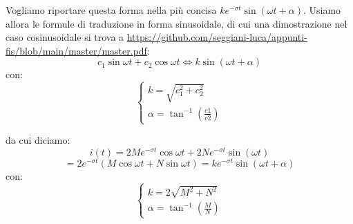 \documentclass[a4paper,11pt]{article}
\begin{document}
Vogliamo riportare questa forma nella più concisa $ke^{-\sigma t} \sin(\omega t + \alpha)$. Usiamo allora le formule di traduzione in forma sinusoidale, di cui una dimostrazione nel caso cosinusoidale si trova a \url{https://github.com/seggiani-luca/appunti-fis/blob/main/master/master.pdf}:
\[
	c_1 \sin{\omega t} + c_2 \cos{\omega t}
	\Leftrightarrow
	k \sin(\omega t + \alpha)
\]
con:
\[
	\begin{cases}
		k = \sqrt{c_1^2 + c_2^2} \\ 
		\alpha = \tan^{-1}(\frac{c1}{c2})
	\end{cases}
\]

da cui diciamo:
$$
i(t) = 2 M e^{-\sigma t} \cos{\omega t} + 2 N e^{-\sigma t} \sin(\omega t)
$$
$$
= 2 e^{-\sigma t} \left( M \cos{\omega t} + N \sin{\omega t} \right)
= ke^{-\sigma t} \sin(\omega t + \alpha)
$$
con:
\[
	\begin{cases}
		k = 2\sqrt{M^2 + N^2} \\ 
		\alpha = \tan^{-1}\left(\frac{M}{N}\right)
	\end{cases}
\]
\end{document}
